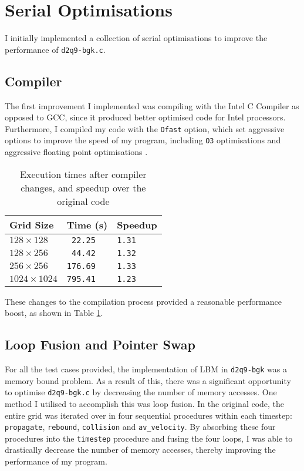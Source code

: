 \documentclass[11pt, twocolumn, a4paper]{article}
\begin{document}
\section{Serial Optimisations}

I initially implemented a collection of serial optimisations to improve the performance of \texttt{d2q9-bgk.c}.

\subsection{Compiler}

The first improvement I implemented was compiling with the Intel C Compiler as opposed to GCC, since it produced better optimised code for Intel processors.
Furthermore, I compiled my code with the \texttt{Ofast} option, which set aggressive options to improve the speed of my program, including \texttt{O3} optimisations and aggressive floating point optimisations \cite{icc}.

\begin{table}[htbp]
  \begin{center}
  \caption{Execution times after compiler changes, and speedup over the original code}\label{tab:compiler_changes}
  \begin{tabular}{l | l l} 
      \hline\hline
      Grid Size&Time (s)&Speedup\\
      \hline
      $128 \times 128$&\texttt{ 22.25}&\texttt{1.31}\\
      $128 \times 256$&\texttt{ 44.42}&\texttt{1.32}\\
      $256 \times 256$&\texttt{176.69}&\texttt{1.33}\\
      $1024 \times 1024$&\texttt{795.41}&\texttt{1.23}\\
      \hline
    \end{tabular}
  \end{center}
\end{table}

These changes to the compilation process provided a reasonable performance boost, as shown in Table \ref{tab:compiler_changes}.

\subsection{Loop Fusion and Pointer Swap}

For all the test cases provided, the implementation of LBM in \texttt{d2q9-bgk} was a memory bound problem.
As a result of this, there was a significant opportunity to optimise \texttt{d2q9-bgk.c} by decreasing the number of memory accesses.
One method I utilised to accomplish this was loop fusion.
In the original code, the entire grid was iterated over in four sequential procedures within each timestep: \texttt{propagate}, \texttt{rebound}, \texttt{collision} and \texttt{av\_velocity}.
By absorbing these four procedures into the \texttt{timestep} procedure and fusing the four loops, I was able to drastically decrease the number of memory accesses, thereby improving the performance of my program.
\end{document}
